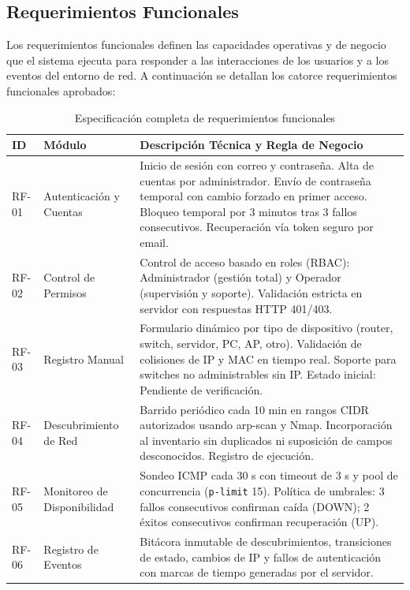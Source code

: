 \documentclass[12pt,a4paper]{report}
\begin{document}
\subsection{Requerimientos Funcionales}

Los requerimientos funcionales definen las capacidades operativas y de negocio que el sistema ejecuta para responder a las interacciones de los usuarios y a los eventos del entorno de red. A continuación se detallan los catorce requerimientos funcionales aprobados:

\begin{table}[H]
\centering
\caption{Especificación completa de requerimientos funcionales}\label{tab:req_funcionales}
\small
\begin{tabularx}{\textwidth}{p{1.4cm} p{3.2cm} X}
\toprule
\textbf{ID} & \textbf{Módulo} & \textbf{Descripción Técnica y Regla de Negocio} \\
\midrule
RF-01 & Autenticación y Cuentas & Inicio de sesión con correo y contraseña. Alta de cuentas por administrador. Envío de contraseña temporal con cambio forzado en primer acceso. Bloqueo temporal por 3 minutos tras 3 fallos consecutivos. Recuperación vía token seguro por email. \\
\midrule
RF-02 & Control de Permisos & Control de acceso basado en roles (RBAC): Administrador (gestión total) y Operador (supervisión y soporte). Validación estricta en servidor con respuestas HTTP 401/403. \\
\midrule
RF-03 & Registro Manual & Formulario dinámico por tipo de dispositivo (router, switch, servidor, PC, AP, otro). Validación de colisiones de IP y MAC en tiempo real. Soporte para switches no administrables sin IP. Estado inicial: Pendiente de verificación. \\
\midrule
RF-04 & Descubrimiento de Red & Barrido periódico cada 10 min en rangos CIDR autorizados usando arp-scan y Nmap. Incorporación al inventario sin duplicados ni suposición de campos desconocidos. Registro de ejecución. \\
\midrule
RF-05 & Monitoreo de Disponibilidad & Sondeo ICMP cada 30 s con timeout de 3 s y pool de concurrencia (\texttt{p-limit} 15). Política de umbrales: 3 fallos consecutivos confirman caída (DOWN); 2 éxitos consecutivos confirman recuperación (UP). \\
\midrule
RF-06 & Registro de Eventos & Bitácora inmutable de descubrimientos, transiciones de estado, cambios de IP y fallos de autenticación con marcas de tiempo generadas por el servidor. \\

\end{tabularx}
\end{table}
\end{document}
